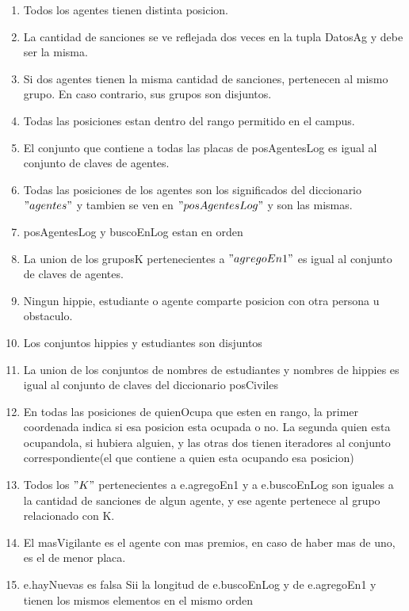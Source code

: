 \hspace*{\disSubSubSecMargen}
\begin{enumerate}
\setlength{\itemindent}{3em}
  \item Todos los agentes tienen distinta posicion.
  \item La cantidad de sanciones se ve reflejada dos veces en la tupla DatosAg y debe ser la misma.
  \item Si dos agentes tienen la misma cantidad de sanciones, pertenecen al mismo grupo. En caso contrario, sus grupos son disjuntos.
  \item Todas las posiciones estan dentro del rango permitido en el campus.
  \item El conjunto que contiene a todas las placas de posAgentesLog es igual al conjunto de claves de agentes. 
  \item Todas las posiciones de los agentes son los significados del diccionario $"agentes"$ y tambien se ven en $"posAgentesLog"$ y son las mismas.
    \item posAgentesLog y buscoEnLog estan en orden

  \item La union de los gruposK pertenecientes a $"agregoEn1"$ es igual al conjunto de claves de agentes.
  \item Ningun hippie, estudiante o agente comparte posicion con otra persona u obstaculo.
    \item Los conjuntos hippies y estudiantes son disjuntos

  \item La union de los conjuntos de nombres de estudiantes y nombres de hippies es igual al conjunto de claves del diccionario posCiviles
  \item En todas las posiciones de quienOcupa que esten en rango, la primer coordenada indica si esa posicion esta ocupada o no. La segunda quien esta ocupandola, si hubiera alguien, y las otras dos tienen iteradores al conjunto correspondiente(el que contiene a quien esta ocupando esa posicion)
  \item Todos los $"K"$ pertenecientes a e.agregoEn1 y a e.buscoEnLog son iguales a la cantidad de sanciones de algun agente, y ese agente pertenece al grupo relacionado con K.
  \item El masVigilante es el agente con mas premios, en caso de haber mas de uno, es el de menor placa.
  \item e.hayNuevas es falsa Sii la longitud de e.buscoEnLog y de e.agregoEn1 y tienen los mismos elementos en el mismo orden
  
\end{enumerate}
